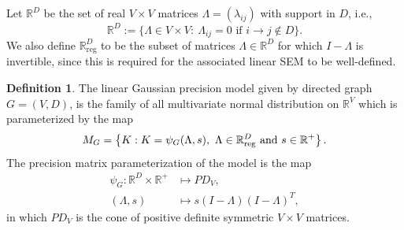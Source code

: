 \documentclass[12pt,reqno]{amsart}
\theoremstyle{plain}
\theoremstyle{definition}
\newtheorem{definition}[theorem]{Definition}
\begin{document}
Let $\mathbb{R}^D$ be the set of real $V\times V$ matrices $\Lambda=(\lambda_{ij})$ with support in $D$, i.e.,
$$
\mathbb{R}^D:=\{\Lambda\in V\times V:\ \Lambda_{ij}=0 \text{ if } i\rightarrow j\notin D\}.
$$
We also define $\mathbb{R}^D_{\text{reg}}$ to be the subset of matrices $\Lambda\in\mathbb{R}^D$ for which $I-\Lambda$ is invertible, since this is required for the associated linear SEM to be well-defined. 
\begin{definition}
The linear Gaussian precision model given by directed graph $G=(V,D)$, is the family of all multivariate normal distribution on $\mathbb{R}^V$ which is parameterized by the map
$$
M_G=\left\{K: K=\psi_G(\Lambda,s),\ \Lambda\in \mathbb{R}^D_{\text{\rm reg}} \text{ \rm and } s\in \mathbb{R}^+\right\}.
$$
The precision matrix parameterization of the model is the map
\begin{align*}
\psi_G: \mathbb{R}^D\times \mathbb{R}^+ &\mapsto PD_V,\\
(\Lambda,s) &\mapsto s(I-\Lambda)(I-\Lambda)^T,
\end{align*}
in which $PD_V$ is the cone of positive definite symmetric $V\times V$ matrices.
\end{definition}
\end{document}
